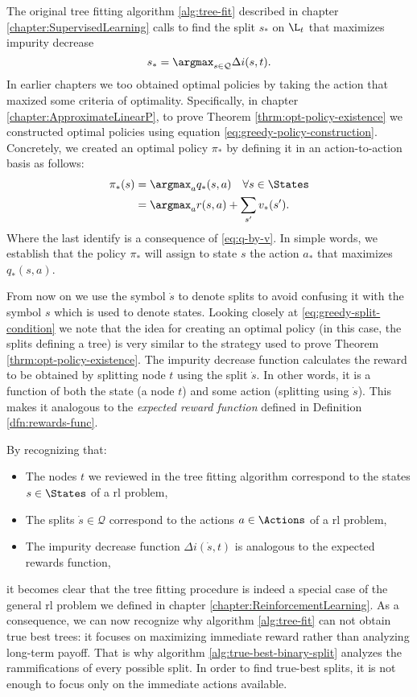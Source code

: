 The original tree fitting algorithm \ref{alg:tree-fit} described in chapter
\ref{chapter:SupervisedLearning} calls to find the split $s_*$ on $\L_t$ that
maximizes impurity decrease
\begin{equation}
    \label{eq:greedy-split-condition}
    s_* = \argmax_{s \in \mathcal{Q}} \Delta i(s, t).
\end{equation}
In earlier chapters we too obtained optimal policies by taking the action that
maxized some criteria of optimality. Specifically, in chapter
\ref{chapter:ApproximateLinearP}, to prove Theorem
\ref{thrm:opt-policy-existence} we constructed optimal policies using equation
\eqref{eq:greedy-policy-construction}. Concretely, we created an optimal policy
$\pi_*$ by defining it in an action-to-action basis as follows:
\begin{align*}
    \pi_{*} (s) &= \argmax_{a} q_{*} (s, a) \quad \forall s \in \States \\
    &= \argmax_a r(s, a) + \sum_{s'} v_* (s').
\end{align*}
Where the last identify is a consequence of \eqref{eq:q-by-v}. In simple words,
we establish that the policy $\pi_*$ will assign to state $s$ the action $a_*$
that maximizes $q_* (s, a)$. 

From now on we use the symbol $\dot{s}$ to denote splits to avoid confusing it
with the symbol $s$ which is used to denote states. Looking closely at
\eqref{eq:greedy-split-condition} we note that the idea for creating an optimal
policy (in this case, the splits defining a tree) is very similar to the
strategy used to prove Theorem \ref{thrm:opt-policy-existence}. The impurity
decrease function calculates the reward to be obtained by splitting node $t$
using the split $\dot{s}$. In other words, it is a function of both the state (a
node $t$) and some action (splitting using $\dot{s}$). This makes it analogous
to the \emph{expected reward function} defined in Definition
\ref{dfn:rewards-func}.

By recognizing that:
\begin{itemize}
    \item The nodes $t$ we reviewed in the tree fitting algorithm correspond to
        the states $s \in \States$ of a \ac{rl} problem,
    \item The splits $\dot{s} \in \mathcal{Q}$ correspond to the actions $a \in
        \Actions$ of a \ac{rl} problem,
    \item The impurity decrease function $\Delta i(\dot{s}, t)$ is analogous to
        the expected rewards function,
\end{itemize}
it becomes clear that the tree fitting procedure is indeed a special case of the
general \ac{rl} problem we defined in chapter
\ref{chapter:ReinforcementLearning}. As a consequence, we can now recognize why
algorithm \ref{alg:tree-fit} can not obtain true best trees: it focuses on
maximizing immediate reward rather than analyzing long-term payoff. That is why
algorithm \ref{alg:true-best-binary-split} analyzes the rammifications of every
possible split. In order to find true-best splits, it is not enough to focus
only on the immediate actions available.

